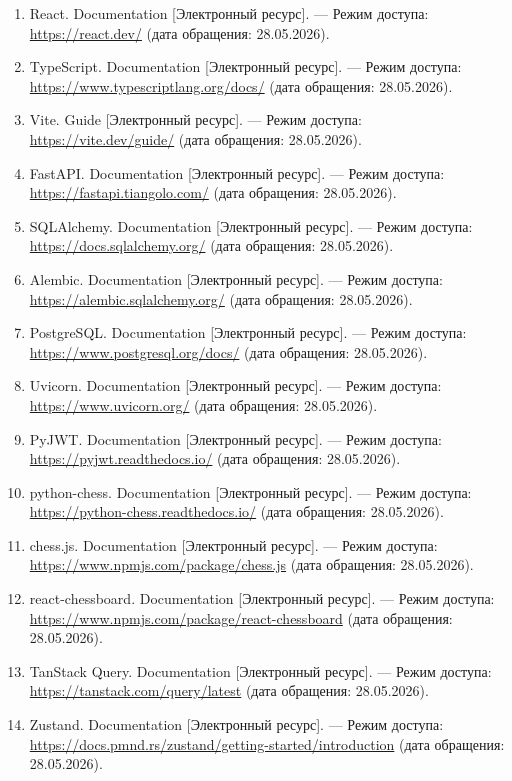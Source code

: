 \documentclass[14pt,a4paper]{extreport}
\begin{document}
\begin{enumerate}[leftmargin=1.25cm,itemsep=0pt,topsep=0pt]
\item React. Documentation [Электронный ресурс]. — Режим доступа: \url{https://react.dev/} (дата обращения: 28.05.2026).
\item TypeScript. Documentation [Электронный ресурс]. — Режим доступа: \url{https://www.typescriptlang.org/docs/} (дата обращения: 28.05.2026).
\item Vite. Guide [Электронный ресурс]. — Режим доступа: \url{https://vite.dev/guide/} (дата обращения: 28.05.2026).
\item FastAPI. Documentation [Электронный ресурс]. — Режим доступа: \url{https://fastapi.tiangolo.com/} (дата обращения: 28.05.2026).
\item SQLAlchemy. Documentation [Электронный ресурс]. — Режим доступа: \url{https://docs.sqlalchemy.org/} (дата обращения: 28.05.2026).
\item Alembic. Documentation [Электронный ресурс]. — Режим доступа: \url{https://alembic.sqlalchemy.org/} (дата обращения: 28.05.2026).
\item PostgreSQL. Documentation [Электронный ресурс]. — Режим доступа: \url{https://www.postgresql.org/docs/} (дата обращения: 28.05.2026).
\item Uvicorn. Documentation [Электронный ресурс]. — Режим доступа: \url{https://www.uvicorn.org/} (дата обращения: 28.05.2026).
\item PyJWT. Documentation [Электронный ресурс]. — Режим доступа: \url{https://pyjwt.readthedocs.io/} (дата обращения: 28.05.2026).
\item python-chess. Documentation [Электронный ресурс]. — Режим доступа: \url{https://python-chess.readthedocs.io/} (дата обращения: 28.05.2026).
\item chess.js. Documentation [Электронный ресурс]. — Режим доступа: \url{https://www.npmjs.com/package/chess.js} (дата обращения: 28.05.2026).
\item react-chessboard. Documentation [Электронный ресурс]. — Режим доступа: \url{https://www.npmjs.com/package/react-chessboard} (дата обращения: 28.05.2026).
\item TanStack Query. Documentation [Электронный ресурс]. — Режим доступа: \url{https://tanstack.com/query/latest} (дата обращения: 28.05.2026).
\item Zustand. Documentation [Электронный ресурс]. — Режим доступа: \url{https://docs.pmnd.rs/zustand/getting-started/introduction} (дата обращения: 28.05.2026).

\end{enumerate}
\end{document}
